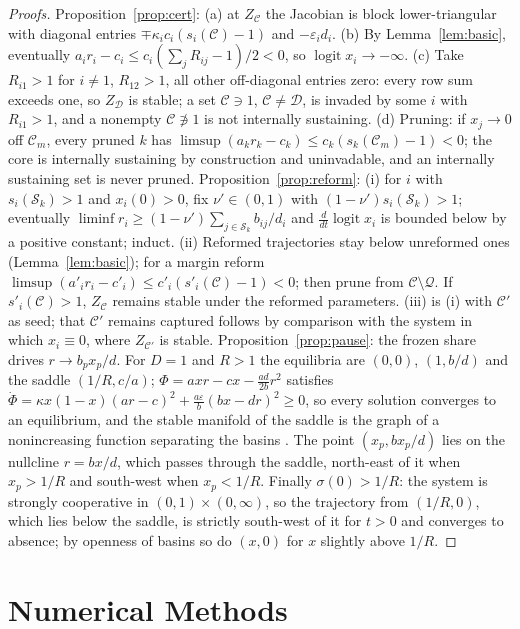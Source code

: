 \documentclass[letterpaper]{article} %
\theoremstyle{definition}
\newcommand{\cC}{\mathcal{C}}
\newcommand{\cQ}{\mathcal{Q}}
\newcommand{\cS}{\mathcal{S}}
\newcommand{\cD}{\mathcal{D}}
\begin{document}
\begin{proof}[Proofs]
Proposition~\ref{prop:cert}: (a) at $Z_\cC$ the Jacobian is block lower-triangular with diagonal entries $\mp\kappa_ic_i(s_i(\cC)-1)$ and $-\varepsilon_id_i$. (b) By Lemma~\ref{lem:basic}, eventually $a_ir_i-c_i\le c_i(\sum_jR_{ij}-1)/2<0$, so $\operatorname{logit}x_i\to-\infty$. (c) Take $R_{i1}>1$ for $i\neq1$, $R_{12}>1$, all other off-diagonal entries zero: every row sum exceeds one, so $Z_\cD$ is stable; a set $\cC\ni1$, $\cC\neq\cD$, is invaded by some $i$ with $R_{i1}>1$, and a nonempty $\cC\not\ni1$ is not internally sustaining. (d) Pruning: if $x_j\to0$ off $\cC_m$, every pruned $k$ has $\limsup(a_kr_k-c_k)\le c_k(s_k(\cC_m)-1)<0$; the core is internally sustaining by construction and uninvadable, and an internally sustaining set is never pruned. Proposition~\ref{prop:reform}: (i) for $i$ with $s_i(\cS_k)>1$ and $x_i(0)>0$, fix $\nu'\in(0,1)$ with $(1-\nu')s_i(\cS_k)>1$; eventually $\liminf r_i\ge(1-\nu')\sum_{j\in\cS_k}b_{ij}/d_i$ and $\frac{d}{dt}\operatorname{logit}x_i$ is bounded below by a positive constant; induct. (ii) Reformed trajectories stay below unreformed ones (Lemma~\ref{lem:basic}); for a margin reform $\limsup(a'_ir_i-c'_i)\le c'_i(s'_i(\cC)-1)<0$; then prune from $\cC\setminus\cQ$. If $s'_i(\cC)>1$, $Z_\cC$ remains stable under the reformed parameters. (iii) is (i) with $\cC'$ as seed; that $\cC'$ remains captured follows by comparison with the system in which $x_i\equiv0$, where $Z_{\cC'}$ is stable. Proposition~\ref{prop:pause}: the frozen share drives $r\to b_px_p/d$. For $D=1$ and $R>1$ the equilibria are $(0,0)$, $(1,b/d)$ and the saddle $(1/R,c/a)$; $\Phi=axr-cx-\frac{ad}{2b}r^2$ satisfies $\dot\Phi=\kappa x(1-x)(ar-c)^2+\frac{a\varepsilon}{b}(bx-dr)^2\ge0$, so every solution converges to an equilibrium, and the stable manifold of the saddle is the graph of a nonincreasing function separating the basins \citep{hirsch1985,smith1995}. The point $(x_p,bx_p/d)$ lies on the nullcline $r=bx/d$, which passes through the saddle, north-east of it when $x_p>1/R$ and south-west when $x_p<1/R$. Finally $\sigma(0)>1/R$: the system is strongly cooperative in $(0,1)\times(0,\infty)$, so the trajectory from $(1/R,0)$, which lies below the saddle, is strictly south-west of it for $t>0$ and converges to absence; by openness of basins so do $(x,0)$ for $x$ slightly above $1/R$.
\end{proof}

\section{Numerical Methods}\label{app:numerics}
\end{document}
